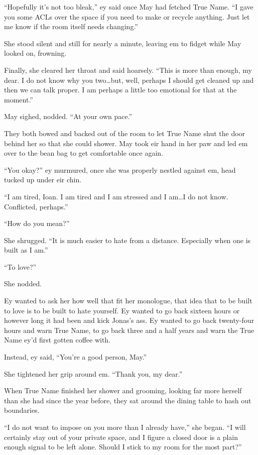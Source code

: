 ``Hopefully it's not too bleak,'' ey said once May had fetched True Name. ``I gave you some ACLs over the space if you need to make or recycle anything. Just let me know if the room itself needs changing.''

She stood silent and still for nearly a minute, leaving em to fidget while May looked on, frowning.

Finally, she cleared her throat and said hoarsely. ``This is more than enough, my dear. I do not know why you two\ldots but, well, perhaps I should get cleaned up and then we can talk proper. I am perhaps a little too emotional for that at the moment.''

May sighed, nodded. ``At your own pace.''

They both bowed and backed out of the room to let True Name shut the door behind her so that she could shower. May took eir hand in her paw and led em over to the bean bag to get comfortable once again.

``You okay?'' ey murmured, once she was properly nestled against em, head tucked up under eir chin.

``I am tired, Ioan. I am tired and I am stressed and I am\ldots I do not know. Conflicted, perhaps.''

``How do you mean?''

She shrugged. ``It is much easier to hate from a distance. Especially when one is built as I am.''

``To love?''

She nodded.

Ey wanted to ask her how well that fit her monologue, that idea that to be built to love is to be built to hate yourself. Ey wanted to go back sixteen hours or however long it had been and kick Jonas's ass. Ey wanted to go back twenty-four hours and warn True Name, to go back three and a half years and warn the True Name ey'd first gotten coffee with.

Instead, ey said, ``You're a good person, May.''

She tightened her grip around em. ``Thank you, my dear.''

When True Name finished her shower and grooming, looking far more herself than she had since the year before, they sat around the dining table to hash out boundaries.

``I do not want to impose on you more than I already have,'' she began. ``I will certainly stay out of your private space, and I figure a closed door is a plain enough signal to be left alone. Should I stick to my room for the most part?''

